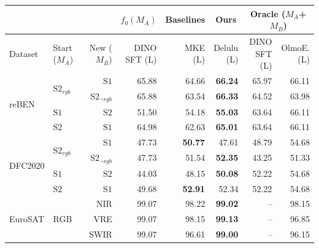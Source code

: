 \begin{tabular}{llr | r r r r r}
\toprule
\multicolumn{3}{c}{} & \multicolumn{1}{c|}{$f_0(M_A)$} & \multicolumn{1}{c|}{Baselines} & \multicolumn{1}{c|}{Ours} & \multicolumn{2}{c}{Oracle ($M_A$+$M_B$)} \\
\midrule
Dataset & \shortstack[c]{Start\\($M_A$)} & \shortstack[c]{New\\($M_B$)} & \shortstack[c]{DINO\\SFT (L)} & \shortstack[c]{MKE\\(L)} & \shortstack[c]{Delulu\\(L)} & \shortstack[c]{DINO\\SFT (L)} & \shortstack[c]{OlmoE.\\(L)} \\
\midrule
  \multirow{4}{*}{reBEN} & \multirow{2}{*}{$\mathrm{S2}_{rgb}$} & $\mathrm{S1}$ & 65.88 & 64.66 & \textbf{66.24} & 65.97 & 66.11 \\
   &  & $\mathrm{S2}_{\neg rgb}$ & 65.88 & 63.54 & \textbf{66.33} & 64.52 & 63.98 \\
   & $\mathrm{S1}$ & $\mathrm{S2}$ & 51.50 & 54.18 & \textbf{55.03} & 63.64 & 66.11 \\
   & $\mathrm{S2}$ & $\mathrm{S1}$ & 64.98 & 62.63 & \textbf{65.01} & 63.64 & 66.11 \\
  \midrule
  \multirow{4}{*}{DFC2020} & \multirow{2}{*}{$\mathrm{S2}_{rgb}$} & $\mathrm{S1}$ & 47.73 & \textbf{50.77} & 47.61 & 48.79 & 54.68 \\
   &  & $\mathrm{S2}_{\neg rgb}$ & 47.73 & 51.54 & \textbf{52.35} & 43.25 & 51.33 \\
   & $\mathrm{S1}$ & $\mathrm{S2}$ & 44.03 & 48.15 & \textbf{50.08} & 52.22 & 54.68 \\
   & $\mathrm{S2}$ & $\mathrm{S1}$ & 49.68 & \textbf{52.91} & 52.34 & 52.22 & 54.68 \\
  \midrule
  \multirow{3}{*}{EuroSAT} & \multirow{3}{*}{RGB} & NIR & 99.07 & 98.22 & \textbf{99.02} & -- & 98.15 \\
   &  & VRE & 99.07 & 98.15 & \textbf{99.13} & -- & 96.85 \\
   &  & SWIR & 99.07 & 96.61 & \textbf{99.00} & -- & 96.15 \\
\bottomrule
\end{tabular}

